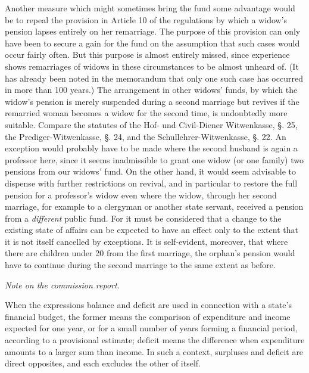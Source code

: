 Another measure which might sometimes bring the fund some advantage would be to repeal the provision in Article 10 of the regulations by which a widow's pension lapses entirely on her remarriage. The purpose of this provision can only have been to secure a gain for the fund on the assumption that such cases would occur fairly often. But this purpose is almost entirely missed, since experience shows remarriages of widows in these circumstances to be almost unheard of. (It has already been noted in the memorandum that only one such case has occurred in more than 100 years.) The arrangement in other widows' funds, by which the widow's pension is merely suspended during a second marriage but revives if the remarried woman becomes a widow for the second time, is undoubtedly more suitable. Compare the statutes of the Hof- und Civil-Diener Witwenkasse, §. 25, the Prediger-Witwenkasse, §. 24, and the Schullehrer-Witwenkasse, §. 22. An exception would probably have to be made where the second husband is again a professor here, since it seems inadmissible to grant one widow (or one family) two pensions from our widows' fund. On the other hand, it would seem advisable to dispense with further restrictions on revival, and in particular to restore the full pension for a professor's widow even where the widow, through her second marriage, for example to a clergyman or another state servant, received a pension from a \textit{different} public fund. For it must be considered that a change to the existing state of affairs can be expected to have an effect only to the extent that it is not itself cancelled by exceptions. It is self-evident, moreover, that where there are children under 20 from the first marriage, the orphan's pension would have to continue during the second marriage to the same extent as before.

\begin{center}\textit{Note on the commission report.}\end{center}
\noindent\hspace*{\parindent}When the expressions balance and deficit are used in connection with a state's financial budget, the former means the comparison of expenditure and income expected for one year, or for a small number of years forming a financial period, according to a provisional
estimate; deficit means the difference when expenditure amounts to a larger sum than income. In such a context, surpluses and deficit are direct opposites, and each excludes the other of itself.


